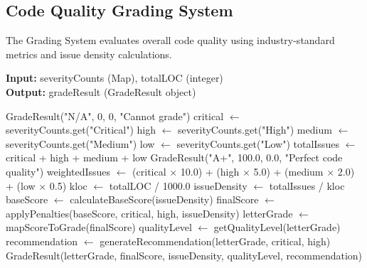\documentclass[12pt,a4paper]{article}
\begin{document}
    \subsection{Code Quality Grading System}

    The Grading System evaluates overall code quality using industry-standard metrics and issue density calculations.

    \begin{algorithm}[H]
        \caption{calculateGrade}
        \textbf{Input:} severityCounts (Map), totalLOC (integer)\\
        \textbf{Output:} gradeResult (GradeResult object)
        \begin{algorithmic}[1]
                \Return GradeResult("N/A", 0, 0, "Cannot grade")
            \EndIf
            \State critical $\gets$ severityCounts.get("Critical")
            \State high $\gets$ severityCounts.get("High")
            \State medium $\gets$ severityCounts.get("Medium")
            \State low $\gets$ severityCounts.get("Low")
            \State totalIssues $\gets$ critical + high + medium + low
                \Return GradeResult("A+", 100.0, 0.0, "Perfect code quality")
            \EndIf
            \State weightedIssues $\gets$ (critical $\times$ 10.0) + (high $\times$ 5.0) + (medium $\times$ 2.0) + (low $\times$ 0.5)
            \State kloc $\gets$ totalLOC / 1000.0
            \State issueDensity $\gets$ totalIssues / kloc
            \State baseScore $\gets$ calculateBaseScore(issueDensity)
            \State finalScore $\gets$ applyPenalties(baseScore, critical, high, issueDensity)
            \State letterGrade $\gets$ mapScoreToGrade(finalScore)
            \State qualityLevel $\gets$ getQualityLevel(letterGrade)
            \State recommendation $\gets$ generateRecommendation(letterGrade, critical, high)
            \Return GradeResult(letterGrade, finalScore, issueDensity, qualityLevel, recommendation)
        \end{algorithmic}
    \end{algorithm}
\end{document}
